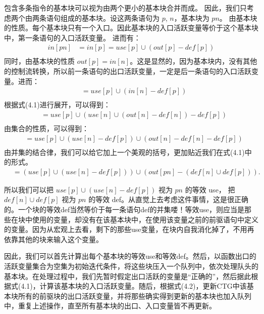 包含多条指令的基本块可以视为由两个更小的基本块合并而成。
因此，我们只考虑两个由两条语句组成的基本块。设这两条语句为 $p$, $n$，基本块为 $pn$。
由基本块的性质。每个基本块只有一个入口。因此基本块的入口活跃变量等价于这个基本块中，第一条语句的入口活跃变量。
进而有：
\begin{align*}
  \mathit{in}[pn] &= \mathit{in}[p] = \mathit{use}[p] \cup (\mathit{out}[p] - \mathit{def}[p]) \\
\end{align*}
同时，由基本块的性质 $\mathit{out}[p] = \mathit{in}[n]$。这是显然的，因为基本块内，没有其他的控制流转换，所以前一条语句的出口活跃变量，一定是后一条语句的入口活跃变量。进而：
\begin{align*}
  &= \mathit{use}[p] \cup (\mathit{in}[n] - \mathit{def}[p]) \\
\end{align*}
根据式(4.1)进行展开，可以得到：
\begin{align*}
  &= \mathit{use}[p] \cup \left(\mathit{use}[n] \cup (\mathit{out}[n] - \mathit{def}[n]) - \mathit{def}[p]\right) \\
\end{align*}
由集合的性质，可以得到：
\begin{align*}
  &= \mathit{use}[p] \cup (\mathit{use}[n] - \mathit{def}[p]) \cup (\mathit{out}[n] - \mathit{def}[n] - \mathit{def}[p]) \\
\end{align*}
由并集的结合律，我们可以给它加上一个美观的括号，更加贴近我们在式(4.1)中的形式。
\begin{align*}
  &= \left(\mathit{use}[p] \cup (\mathit{use}[n] - \mathit{def}[p])\right) \cup \left(\mathit{out}[pn]
   - (\mathit{def}[n] \cup \mathit{def}[p])\right).
\end{align*}

所以我们可以把 $\mathit{use}[p] \cup (\mathit{use}[n] - \mathit{def}[p])$ 视为 $pn$ 的等效 use，
把 $\mathit{def}[n] \cup \mathit{def}[p]$ 视为 $pn$ 的等效 def。从直觉上去考虑这件事情，这是很正确的。一个块的等效def当然等价于每一条语句def的并集喽！等效use，则应当是那些在块中使用的变量，却没有在该基本块中，在使用该变量之前的前驱语句中定义的变量。因为从宏观上去看，剩下的那些use变量，在块内自我消化掉了，不用再依靠其他的块来输入这个变量。

因此，我们可以首先计算出每个基本块的等效use和等效def。然后，以函数出口的活跃变量集合为空集为初始迭代条件，将这些块压入一个队列中，依次处理队头的基本块。在处理过程中，我们先暂时假定出口活跃的变量是“正确的”，然后据此根据式(4.1)，计算该基本块的入口活跃变量。随后，根据式(4.2)，更新CTG中该基本块所有的前驱块的出口活跃变量，并将那些确实得到更新的基本块也加入队列中，重复上述操作，直至所有基本块的出口、入口变量皆不再更新。

